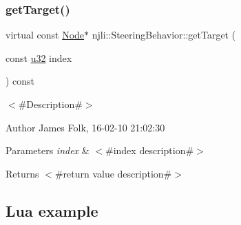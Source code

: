 \begin{DoxyCodeInclude}
\end{DoxyCodeInclude}
\mbox{\label{classnjli_1_1_steering_behavior_a7c2cdca1ff34e7b4882847bd2ba6b222}} 
\subsubsection{\texorpdfstring{get\+Target()}{getTarget()}\hspace{0.1cm}{\footnotesize\ttfamily [2/2]}}
{\footnotesize\ttfamily virtual const \mbox{\hyperlink{classnjli_1_1_node}{Node}}$\ast$ njli\+::\+Steering\+Behavior\+::get\+Target (\begin{DoxyParamCaption}\item[{const \mbox{\hyperlink{_util_8h_a10e94b422ef0c20dcdec20d31a1f5049}{u32}}}]{index }\end{DoxyParamCaption}) const\hspace{0.3cm}{\ttfamily [virtual]}}



$<$\#\+Description\#$>$ 

\begin{DoxyAuthor}{Author}
James Folk, 16-\/02-\/10 21\+:02\+:30
\end{DoxyAuthor}

\begin{DoxyParams}{Parameters}
{\em index} & $<$\#index description\#$>$\\
\hline
\end{DoxyParams}
\begin{DoxyReturn}{Returns}
$<$\#return value description\#$>$
\end{DoxyReturn}
\hypertarget{classnjli_1_1_steering_behavior_wander_ex1}{}\subsection{Lua example}\label{classnjli_1_1_steering_behavior_wander_ex1}

\begin{DoxyCodeInclude}
\end{DoxyCodeInclude}
\mbox{\label{classnjli_1_1_steering_behavior_aa8e882405b1cbeb62abeb154084dfccf}} 
